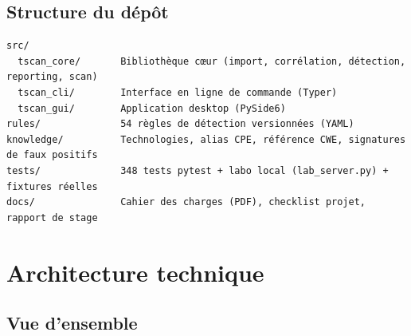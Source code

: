 \documentclass[11pt,a4paper]{report}
\begin{document}
\section{Structure du dépôt}

\begin{verbatim}
src/
  tscan_core/       Bibliothèque cœur (import, corrélation, détection, reporting, scan)
  tscan_cli/        Interface en ligne de commande (Typer)
  tscan_gui/        Application desktop (PySide6)
rules/              54 règles de détection versionnées (YAML)
knowledge/          Technologies, alias CPE, référence CWE, signatures de faux positifs
tests/              348 tests pytest + labo local (lab_server.py) + fixtures réelles
docs/               Cahier des charges (PDF), checklist projet, rapport de stage
\end{verbatim}

\chapter{Architecture technique}

\section{Vue d'ensemble}
\end{document}
